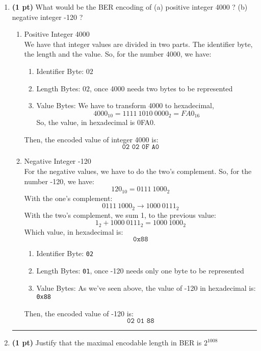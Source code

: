 \documentclass[a4paper,10pt]{article}
\begin{document}
\begin{enumerate}[label=\textbf{Question \arabic*.}]
    \item \textbf{(1 pt)} What would be the BER encoding of (a) positive integer 4000 ? (b) negative integer -120 ?
    \begin{enumerate}
        \item Positive Integer 4000 \\
        We have that integer values are divided in two parts. The identifier byte, the length and the value. So, for the number 4000, we have:
        \begin{enumerate}[label=\text{-}]
            \item Identifier Byte: $02$
            \item Length Bytes: $02$, once 4000 needs two bytes to be represented
            \item Value Bytes: We have to transform 4000 to hexadecimal,
            \[4000_{10} = 1111\ 1010\ 0000_{2} = FA0_{16}\]
            So, the value, in hexadecimal is 0FA0.
        \end{enumerate}
        Then, the encoded value of integer 4000 is:
        \[\texttt{02\ 02\ 0F\ A0}\]
        \item Negative Integer -120\\
        For the negative values, we have to do the two's complement. So, for the number -120, we have: \\
        \[120_{10} = 0111\ 1000_{2}\]
        With the one's complement:
        \[0111\ 1000_{2} \to 1000\ 0111_{2}\]
        With the two's complement, we sum 1, to the previous value:
        \[1_{2} + 1000\ 0111_{2} = 1000\ 1000_{2}\]
        Which value, in hexadecimal is:
        \[\texttt{0x88}\]
        \begin{enumerate}[label=\text{-}]
            \item Identifier Byte: \texttt{02}
            \item Length Bytes: \texttt{01}, once -120 needs only one byte to be represented
            \item Value Bytes: As we've seen above, the value of -120 in hexadecimal is: \texttt{0x88}
        \end{enumerate}
        Then, the encoded value of -120 is:
        \[\texttt{02\ 01\ 88}\]
    \end{enumerate}
    \noindent\rule{\textwidth}{0.4mm}
    
    \item \textbf{(1 pt)} Justify that the maximal encodable length in BER is \texttt{$2^{1008}$} \\ 


\end{enumerate}
\end{document}
